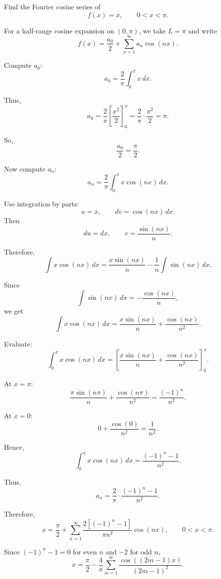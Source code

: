 \begin{examplebox}
    Find the Fourier cosine series of
    \[
        f(x)=x,\qquad 0<x<\pi.
    \]

    For a half-range cosine expansion on $(0,\pi)$, we take $L=\pi$ and write
    \[
        f(x)=\frac{a_0}{2}+\sum_{n=1}^{\infty}a_n\cos(nx).
    \]

    Compute $a_0$:
    \[
        a_0=\frac{2}{\pi}\int_0^\pi x\,dx.
    \]

    Thus,
    \[
        a_0=\frac{2}{\pi}\left[\frac{x^2}{2}\right]_0^\pi
        =
        \frac{2}{\pi}\cdot\frac{\pi^2}{2}
        =
        \pi.
    \]

    So,
    \[
        \frac{a_0}{2}=\frac{\pi}{2}.
    \]

    Now compute $a_n$:
    \[
        a_n=\frac{2}{\pi}\int_0^\pi x\cos(nx)\,dx.
    \]

    Use integration by parts:
    \[
        u=x,\qquad dv=\cos(nx)\,dx.
    \]
    Then
    \[
        du=dx,\qquad v=\frac{\sin(nx)}{n}.
    \]

    Therefore,
    \[
        \int x\cos(nx)\,dx
        =
        \frac{x\sin(nx)}{n}
        -
        \frac{1}{n}\int \sin(nx)\,dx.
    \]

    Since
    \[
        \int \sin(nx)\,dx=-\frac{\cos(nx)}{n},
    \]
    we get
    \[
        \int x\cos(nx)\,dx
        =
        \frac{x\sin(nx)}{n}
        +
        \frac{\cos(nx)}{n^2}.
    \]

    Evaluate:
    \[
        \int_0^\pi x\cos(nx)\,dx
        =
        \left[
            \frac{x\sin(nx)}{n}
            +
            \frac{\cos(nx)}{n^2}
            \right]_0^\pi.
    \]

    At $x=\pi$:
    \[
        \frac{\pi\sin(n\pi)}{n}+\frac{\cos(n\pi)}{n^2}
        =
        \frac{(-1)^n}{n^2}.
    \]

    At $x=0$:
    \[
        0+\frac{\cos(0)}{n^2}
        =
        \frac{1}{n^2}.
    \]

    Hence,
    \[
        \int_0^\pi x\cos(nx)\,dx
        =
        \frac{(-1)^n-1}{n^2}.
    \]

    Thus,
    \[
        a_n=
        \frac{2}{\pi}
        \cdot
        \frac{(-1)^n-1}{n^2}.
    \]

    Therefore,
    \[
        x=\frac{\pi}{2}
        +
        \sum_{n=1}^{\infty}
        \frac{2\left[(-1)^n-1\right]}{\pi n^2}
        \cos(nx),
        \qquad 0<x<\pi.
    \]

    Since $(-1)^n-1=0$ for even $n$ and $-2$ for odd $n$,
    \[
        x=\frac{\pi}{2}
        -
        \frac{4}{\pi}
        \sum_{m=1}^{\infty}
        \frac{\cos\left((2m-1)x\right)}{(2m-1)^2}.
    \]
\end{examplebox}

